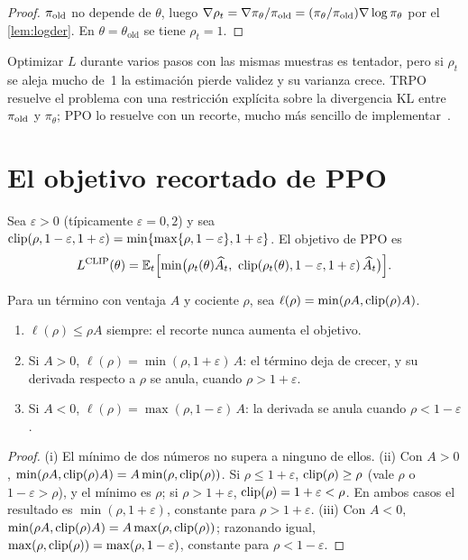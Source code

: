 \begin{proof}
$\pi_{\mathrm{old}}$ no depende de $\theta$, luego $\nabla\rho_t=\nabla\pi_\theta/\pi_{\mathrm{old}}=(\pi_\theta/\pi_{\mathrm{old}})\nabla\log\pi_\theta$ por el \cref{lem:logder}. En $\theta=\theta_{\mathrm{old}}$ se tiene $\rho_t=1$.
\end{proof}

Optimizar $L$ durante varios pasos con las mismas muestras es tentador, pero si $\rho_t$ se aleja mucho de~1 la estimación pierde validez y su varianza crece. TRPO resuelve el problema con una restricción explícita sobre la divergencia KL entre $\pi_{\mathrm{old}}$ y $\pi_\theta$; PPO lo resuelve con un recorte, mucho más sencillo de implementar~\cite{cs285,ppo}.

\section{El objetivo recortado de PPO}

\begin{definicion}\label{def:ppo}
Sea $\varepsilon>0$ (típicamente $\varepsilon=0{,}2$) y sea $\operatorname{clip}(\rho,1-\varepsilon,1+\varepsilon)=\min\{\max\{\rho,1-\varepsilon\},1+\varepsilon\}$. El objetivo de PPO es~\cite[§3]{ppo}
\[
L^{\mathrm{CLIP}}(\theta)=\mathbb{E}_t\Bigl[\min\bigl(\rho_t(\theta)\widehat A_t,\ \operatorname{clip}(\rho_t(\theta),1-\varepsilon,1+\varepsilon)\,\widehat A_t\bigr)\Bigr].
\]
\end{definicion}

\begin{proposicion}\label{prop:ppo-casos}
Para un término con ventaja $A$ y cociente $\rho$, sea $\ell(\rho)=\min(\rho A,\operatorname{clip}(\rho)A)$.
\begin{enumerate}
  \item $\ell(\rho)\le\rho A$ siempre: el recorte nunca aumenta el objetivo.
  \item Si $A>0$, $\ell(\rho)=\min(\rho,1+\varepsilon)\,A$: el término deja de crecer, y su derivada respecto a $\rho$ se anula, cuando $\rho>1+\varepsilon$.
  \item Si $A<0$, $\ell(\rho)=\max(\rho,1-\varepsilon)\,A$: la derivada se anula cuando $\rho<1-\varepsilon$.
\end{enumerate}
\end{proposicion}

\begin{proof}
(i) El mínimo de dos números no supera a ninguno de ellos. (ii) Con $A>0$, $\min(\rho A,\operatorname{clip}(\rho)A)=A\min(\rho,\operatorname{clip}(\rho))$. Si $\rho\le 1+\varepsilon$, $\operatorname{clip}(\rho)\ge\rho$ (vale $\rho$ o $1-\varepsilon>\rho$), y el mínimo es $\rho$; si $\rho>1+\varepsilon$, $\operatorname{clip}(\rho)=1+\varepsilon<\rho$. En ambos casos el resultado es $\min(\rho,1+\varepsilon)$, constante para $\rho>1+\varepsilon$. (iii) Con $A<0$, $\min(\rho A,\operatorname{clip}(\rho)A)=A\max(\rho,\operatorname{clip}(\rho))$; razonando igual, $\max(\rho,\operatorname{clip}(\rho))=\max(\rho,1-\varepsilon)$, constante para $\rho<1-\varepsilon$.
\end{proof}

